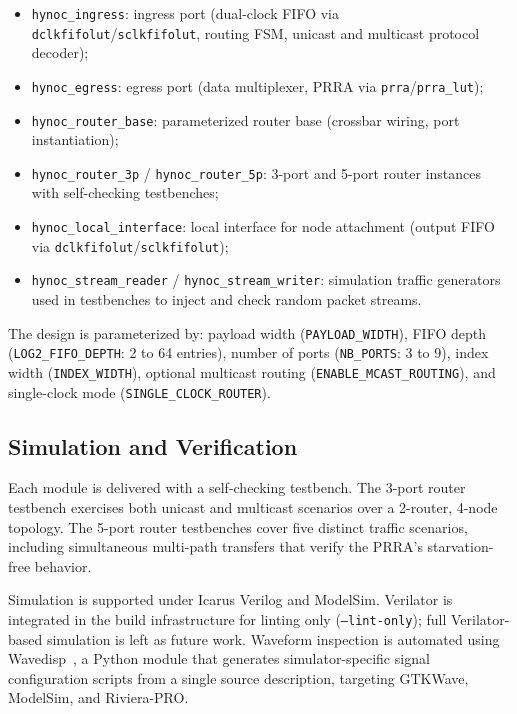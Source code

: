 \begin{itemize}
  \item \texttt{hynoc\_ingress}: ingress port (dual-clock FIFO via
        \texttt{dclkfifolut}/\texttt{sclkfifolut}, routing FSM, unicast and
        multicast protocol decoder);
  \item \texttt{hynoc\_egress}: egress port (data multiplexer, PRRA via
        \texttt{prra}/\texttt{prra\_lut});
  \item \texttt{hynoc\_router\_base}: parameterized router base (crossbar wiring,
        port instantiation);
  \item \texttt{hynoc\_router\_3p} / \texttt{hynoc\_router\_5p}: 3-port and
        5-port router instances with self-checking testbenches;
  \item \texttt{hynoc\_local\_interface}: local interface for node attachment
        (output FIFO via \texttt{dclkfifolut}/\texttt{sclkfifolut});
  \item \texttt{hynoc\_stream\_reader} / \texttt{hynoc\_stream\_writer}:
        simulation traffic generators used in testbenches to inject and
        check random packet streams.
\end{itemize}

The design is parameterized by: payload width (\texttt{PAYLOAD\_WIDTH}), FIFO
depth (\texttt{LOG2\_FIFO\_DEPTH}: 2 to 64 entries), number of ports
(\texttt{NB\_PORTS}: 3 to 9), index width (\texttt{INDEX\_WIDTH}), optional
multicast routing (\texttt{ENABLE\_MCAST\_ROUTING}), and single-clock mode
(\texttt{SINGLE\_CLOCK\_ROUTER}).

\subsection{Simulation and Verification}

Each module is delivered with a self-checking testbench. The 3-port router
testbench exercises both unicast and multicast scenarios over a 2-router, 4-node
topology. The 5-port router testbenches cover five distinct traffic scenarios,
including simultaneous multi-path transfers that verify the PRRA's starvation-free
behavior.

Simulation is supported under Icarus Verilog and ModelSim. Verilator is
integrated in the build infrastructure for linting only (\texttt{--lint-only});
full Verilator-based simulation is left as future work. Waveform inspection is
automated using Wavedisp~\cite{wavedisp}, a Python module that generates
simulator-specific signal configuration scripts from a single source description,
targeting GTKWave, ModelSim, and Riviera-PRO.

